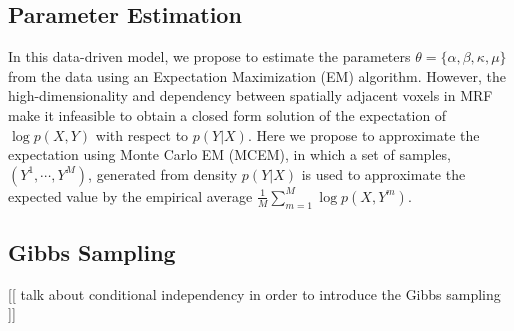\documentclass[final,authoryear,5p,twocolumn]{elsarticle}
\begin{document}
\subsection{Parameter Estimation} 
In this data-driven model, we propose to estimate the parameters $\theta =
\{\alpha, \beta, \kappa, \mu\}$ from the data using an Expectation Maximization
(EM) algorithm. However, the high-dimensionality and dependency between
spatially adjacent voxels in MRF make it infeasible to obtain a closed form
solution of the expectation of $\log p(X,Y)$ with respect to $p(Y|X)$. Here we
propose to approximate the expectation using Monte Carlo EM (MCEM), in which a
set of samples, $(Y^1, \cdots, Y^M)$, generated from density $p(Y|X)$ is used to
approximate the expected value by the empirical average
$\frac{1}{M}\sum_{m=1}^M\log p (X, Y^m)$.

\subsection{Gibbs Sampling} 

[[ talk about conditional independency in order to introduce the Gibbs sampling ]]
\end{document}
